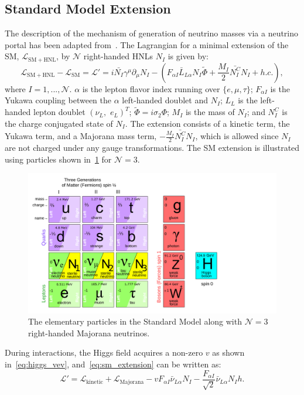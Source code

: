 \subsection{Standard Model Extension}
The description of the mechanism of generation of neutrino masses via a neutrino portal has been adapted from~\cite{Alekhin2016}. The Lagrangian for a minimal extension of the SM, $\mathcal{L_\mathrm{SM+HNL}}$, by $\mathcal{N}$ right-handed HNLs $N_I$ is given by:
\begin{equation}\label{eq:sm_extension}
    \mathcal{L_\mathrm{SM+HNL}}-\mathcal{L_\mathrm{SM}}=\mathcal{L}'= 
    i\bar{N_I}\gamma^\mu \partial_\mu N_I - \left( F_{\alpha I}\bar{L}_{L\alpha}N_I\tilde{\Phi} + \frac{M_I}{2}\bar{N_I^C} N_I + h.c.  \right),
\end{equation}
where $I=1,...,\mathcal{N}$. $\alpha$ is the lepton flavor index running over $\{e, \mu, \tau\}$; $F_{\alpha I}$ is the Yukawa coupling between the $\alpha$ left-handed doublet and $N_I$; $L_L$ is the left-handed lepton doublet $(\nu_L,\,\,e_L)^T$; $\tilde{\Phi}=i\sigma_2\Phi$; $M_I$ is the mass of $N_I$; and $N^C_I$ is the charge conjugated state of $N_I$. The extension consists of a kinetic term, the Yukawa term, and a Majorana mass term, $-\frac{M_I}{2}\bar{N_I^C} N_I$, which is allowed since $N_I$ are not charged under any gauge transformations. The SM extension is illustrated using particles shown in~\cref{fig:sm_extended} for $\mathcal{N}=3$.

\begin{figure}[!th]
    \centering
    \includegraphics[width=.8\linewidth]{figures/theory/SM_with_HNL.pdf}
    \caption{The elementary particles in the Standard Model along with $\mathcal{N}=3$ right-handed Majorana neutrinos.~\cite{Gninenko2012}}
    \label{fig:sm_extended}
\end{figure}

During interactions, the Higgs field acquires a non-zero $v$ as shown in~\cref{eq:higgs_vev}, and~\cref{eq:sm_extension} can be written as:
\begin{equation}
    \mathcal{L}'=\mathcal{L}_\mathrm{kinetic}+\mathcal{L}_\mathrm{Majorana}-vF_{\alpha I}\bar{\nu}_{L\alpha}N_I - \frac{F_{\alpha I}}{\sqrt{2}}\bar{\nu}_{L\alpha}N_I h.
\end{equation}

